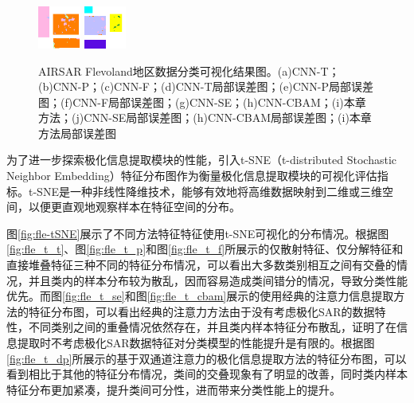 \begin{figure}[ht]
\begin{minipage}[b]{4.74cm}
{            \includegraphics[width=1.4cm]{pic/chapter3/fle/sub-images/1_CNN-DP.PNG} %
            \includegraphics[width=1.4cm]{pic/chapter3/fle/sub-images/2_CNN-DP.PNG} %
        }
    \end{minipage}
    \caption{AIRSAR Flevoland地区数据分类可视化结果图。(a)CNN-T；(b)CNN-P；(c)CNN-F；(d)CNN-T局部误差图；(e)CNN-P局部误差图；(f)CNN-F局部误差图；(g)CNN-SE；(h)CNN-CBAM；(i)本章方法；(j)CNN-SE局部误差图；(h)CNN-CBAM局部误差图；(i)本章方法局部误差图}
    \label{fig:fle_res}
\end{figure}

为了进一步探索极化信息提取模块的性能，引入t-SNE（t-distributed Stochastic Neighbor Embedding）特征分布图作为衡量极化信息提取模块的可视化评估指标。t-SNE是一种非线性降维技术，能够有效地将高维数据映射到二维或三维空间，以便更直观地观察样本在特征空间的分布。

图\ref{fig:fle-tSNE}展示了不同方法特征特征使用t-SNE可视化的分布情况。根据图\ref{fig:fle_t_t}、图\ref{fig:fle_t_p}和图\ref{fig:fle_t_f}所展示的仅散射特征、仅分解特征和直接堆叠特征三种不同的特征分布情况，可以看出大多数类别相互之间有交叠的情况，并且类内的样本分布较为散乱，因而容易造成类间错分的情况，导致分类性能优先。而图\ref{fig:fle_t_se}和图\ref{fig:fle_t_cbam}展示的使用经典的注意力信息提取方法的特征分布图，可以看出经典的注意力方法由于没有考虑极化SAR的数据特性，不同类别之间的重叠情况依然存在，并且类内样本特征分布散乱，证明了在信息提取时不考虑极化SAR数据特征对分类模型的性能提升是有限的。根据图\ref{fig:fle_t_dp}所展示的基于双通道注意力的极化信息提取方法的特征分布图，可以看到相比于其他的特征分布情况，类间的交叠现象有了明显的改善，同时类内样本特征分布更加紧凑，提升类间可分性，进而带来分类性能上的提升。



